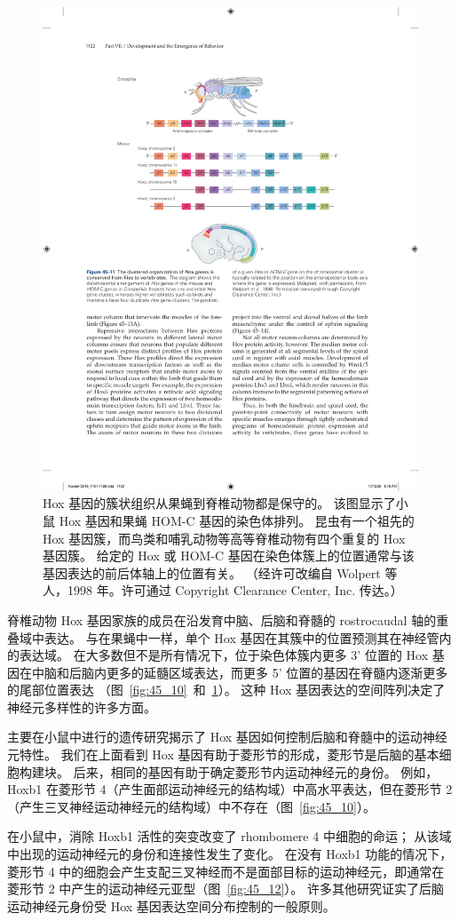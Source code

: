 \begin{figure}[htbp]
	\centering
	\includegraphics[width=0.7\linewidth]{chap45/fig_45_11}
	\caption{Hox 基因的簇状组织从果蝇到脊椎动物都是保守的。 该图显示了小鼠 Hox 基因和果蝇 HOM-C 基因的染色体排列。 昆虫有一个祖先的 Hox 基因簇，而鸟类和哺乳动物等高等脊椎动物有四个重复的 Hox 基因簇。 给定的 Hox 或 HOM-C 基因在染色体簇上的位置通常与该基因表达的前后体轴上的位置有关。 （经许可改编自 Wolpert 等人，1998 年。许可通过 Copyright Clearance Center, Inc. 传达。）}
	\label{fig:45_11}
\end{figure}


脊椎动物 Hox 基因家族的成员在沿发育中脑、后脑和脊髓的 rostrocaudal 轴的重叠域中表达。
与在果蝇中一样，单个 Hox 基因在其簇中的位置预测其在神经管内的表达域。
在大多数但不是所有情况下，位于染色体簇内更多 3' 位置的 Hox 基因在中脑和后脑内更多的延髓区域表达，而更多 5' 位置的基因在脊髓内逐渐更多的尾部位置表达 （图~\ref{fig:45_10}~和~\ref{fig:45_11}）。
这种 Hox 基因表达的空间阵列决定了神经元多样性的许多方面。


主要在小鼠中进行的遗传研究揭示了 Hox 基因如何控制后脑和脊髓中的运动神经元特性。
我们在上面看到 Hox 基因有助于菱形节的形成，菱形节是后脑的基本细胞构建块。
后来，相同的基因有助于确定菱形节内运动神经元的身份。
例如，Hoxb1 在菱形节 4（产生面部运动神经元的结构域）中高水平表达，但在菱形节 2（产生三叉神经运动神经元的结构域）中不存在（图~\ref{fig:45_10}）。


在小鼠中，消除 Hoxb1 活性的突变改变了 rhombomere 4 中细胞的命运；
从该域中出现的运动神经元的身份和连接性发生了变化。 
在没有 Hoxb1 功能的情况下，菱形节 4 中的细胞会产生支配三叉神经而不是面部目标的运动神经元，即通常在菱形节 2 中产生的运动神经元亚型（图~\ref{fig:45_12}）。
许多其他研究证实了后脑运动神经元身份受 Hox 基因表达空间分布控制的一般原则。



